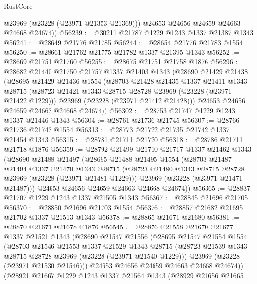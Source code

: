 \begin{lexlean}{RustCore}
\begin{coremodule}
          @23969
          (@23228 (@23971 @21353 @21369)))
        @24653
        @24656
        @24659
        @24663
        @24668
        @24674))
@56239 := @30211 @21787 @1229 @1243 @1337 @21387 @1343
@56241 := @28649 @21776 @21785
@56244 := @28654 @21776 @21783 @1554
@56250 := @28661 @21762 @21775 @21782 @1337 @21395 @1343
@56252 := @28669 @21751 @21760
@56255 := @28675 @21751 @21758 @1876
@56296 := @28682
    @21440
    @21750
    @21757
    @1337
    @21403
    @1343
    (@28690
      @21429
      @21438
      (@28695
        @21429
        @21436
        @1554
        (@28703
          @21428
          @21435
          @1337
          @21411
          @1343
          @28715
          (@28723 @21421 @1343 @28715 @28728 @23969 (@23228 (@23971 @21422 @1229)))
          @23969
          (@23228 (@23971 @21412 @21428)))
        @24653
        @24656
        @24659
        @24663
        @24668
        @24674))
@56302 := @28753 @21747 @1229 @1243 @1337 @21446 @1343
@56304 := @28761 @21736 @21745
@56307 := @28766 @21736 @21743 @1554
@56313 := @28773 @21722 @21735 @21742 @1337 @21454 @1343
@56315 := @28781 @21711 @21720
@56318 := @28786 @21711 @21718 @1876
@56359 := @28792
    @21499
    @21710
    @21717
    @1337
    @21462
    @1343
    (@28690
      @21488
      @21497
      (@28695
        @21488
        @21495
        @1554
        (@28703
          @21487
          @21494
          @1337
          @21470
          @1343
          @28715
          (@28723 @21480 @1343 @28715 @28728 @23969 (@23228 (@23971 @21481 @1229)))
          @23969
          (@23228 (@23971 @21471 @21487)))
        @24653
        @24656
        @24659
        @24663
        @24668
        @24674))
@56365 := @28837 @21707 @1229 @1243 @1337 @21505 @1343
@56367 := @28845 @21696 @21705
@56370 := @28850 @21696 @21703 @1554
@56376 := @28857 @21682 @21695 @21702 @1337 @21513 @1343
@56378 := @28865 @21671 @21680
@56381 := @28870 @21671 @21678 @1876
@56545 := @28876
    @21558
    @21670
    @21677
    @1337
    @21521
    @1343
    (@28690
      @21547
      @21556
      (@28695
        @21547
        @21554
        @1554
        (@28703
          @21546
          @21553
          @1337
          @21529
          @1343
          @28715
          (@28723 @21539 @1343 @28715 @28728 @23969 (@23228 (@23971 @21540 @1229)))
          @23969
          (@23228 (@23971 @21530 @21546)))
        @24653
        @24656
        @24659
        @24663
        @24668
        @24674))
    (@28921
      @21667
      @1229
      @1243
      @1337
      @21564
      @1343
      (@28929
        @21656
        @21665

\end{coremodule}
\end{lexlean}

